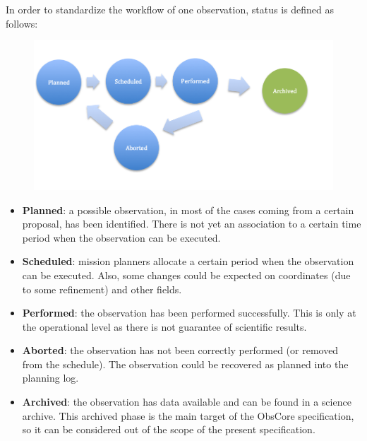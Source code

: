 \documentclass[11pt,a4paper]{ivoa}
\begin{document}
In order to standardize the workflow of one observation, status is defined as follows:

\begin{figure}[H]
\advance\leftskip 0.0in		\hfill\includegraphics{./media/observations_workflow.png}\hfill\strut%
\end{figure}

\begin{itemize}
	\item \textbf{Planned}: a possible observation, in most of the cases coming from a certain proposal, has been identified. There is not yet an association to a certain time period when the observation can be executed.

	\item \textbf{Scheduled}: mission planners allocate a certain period when the 
	observation can be executed. Also, some changes could be expected on coordinates 
	(due to some refinement) and other fields.

	\item \textbf{Performed}: the observation has been performed successfully. This is only at the operational level as there is not guarantee of scientific results.

	\item \textbf{Aborted}: the observation has not been correctly performed (or removed from the schedule). The observation could be recovered as planned into the planning log.

	\item \textbf{Archived}: the observation has data available and can be found in a science archive. This archived phase is the main target of the ObsCore specification, so it can be considered out of the scope of the present specification.
\end{itemize}
\end{document}

